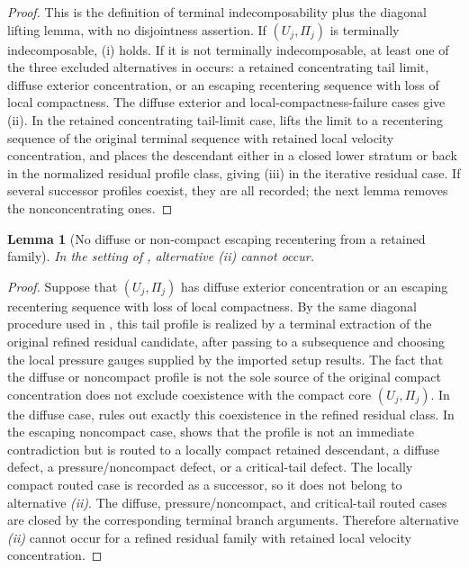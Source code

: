 \documentclass[11pt]{amsart}
\numberwithin{equation}{section}
\theoremstyle{plain}
\newtheorem{lemma}[lemma]{Lemma}
\theoremstyle{definition}
\theoremstyle{remark}
\begin{document}
\begin{proof}
This is the definition of terminal indecomposability plus the diagonal lifting
lemma, with no disjointness assertion.  If \((U_j,\Pi_j)\) is terminally
indecomposable, (i) holds.  If it is not terminally indecomposable, at least one
of the three excluded alternatives in  occurs:
a retained concentrating tail limit, diffuse exterior concentration, or an
escaping recentering sequence with loss of local compactness.  The diffuse
exterior and local-compactness-failure cases give (ii).  In the retained
concentrating tail-limit case,  lifts the
limit to a recentering sequence of the original terminal sequence with retained
local velocity concentration, and  places the descendant
either in a closed lower stratum or back in the normalized residual profile class,
giving (iii) in the iterative residual case.  If several successor profiles
coexist, they are all recorded; the next lemma removes the nonconcentrating ones.
\end{proof}

\begin{lemma}[No diffuse or non-compact escaping recentering from a retained family]
\label{lem:no-inactive-successor}
In the setting of , alternative
\emph{(ii)} cannot occur.
\end{lemma}

\begin{proof}
Suppose that \((U_j,\Pi_j)\) has diffuse exterior concentration or an escaping
recentering sequence with loss of local compactness.  By the same diagonal
procedure used in , this tail profile is
realized by a terminal extraction of the original refined residual candidate,
after passing to a subsequence and choosing the local pressure gauges supplied
by the imported setup results.  The fact that the diffuse or
noncompact profile is not the sole source of the original compact concentration
does not exclude coexistence with the compact core \((U_j,\Pi_j)\).  In the
diffuse case,  rules out exactly this
coexistence in the refined residual class.  In the escaping noncompact case,
 shows that the profile is not
an immediate contradiction but is routed to a locally compact retained
descendant, a diffuse defect, a pressure/noncompact defect, or a critical-tail
defect.  The locally compact routed case is recorded as a successor, so it does
not belong to alternative \emph{(ii)}.  The diffuse, pressure/noncompact, and
critical-tail routed cases are closed by the corresponding terminal branch
arguments.  Therefore alternative \emph{(ii)} cannot occur for a refined
residual family with retained local velocity concentration.
\end{proof}
\end{document}
